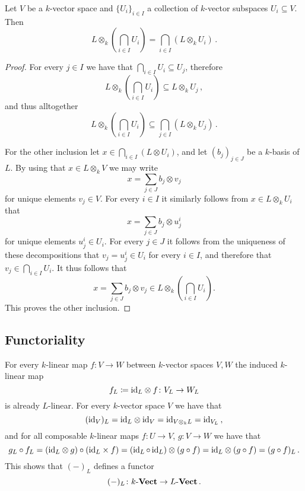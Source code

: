 \begin{corollary}
  Let $V$ be a $k$-vector space and $\{U_i\}_{i \in I}$ a collection of $k$-vector subspaces $U_i \subseteq V$.
  Then
  \[
      L \otimes_k \left( \bigcap_{i \in I} U_i \right)
    = \bigcap_{i \in I} \left( L \otimes_k U_i \right) \,.
  \]
\end{corollary}


\begin{proof}
  For every $j \in I$ we have that $\bigcap_{i \in I} U_i \subseteq U_j$, therefore
  \[
              L \otimes_k \left( \bigcap_{i \in I} U_i \right)
    \subseteq L \otimes_k U_j \,,
  \]
  and thus alltogether
  \[
              L \otimes_k \left( \bigcap_{i \in I} U_i \right)
    \subseteq \bigcap_{j \in I} (L \otimes_k U_j) \,.
  \]
  
  For the other inclusion let $x \in \bigcap_{i \in I} (L \otimes U_i)$, and let $(b_j)_{j \in J}$ be a $k$-basis of $L$.
  By using that $x \in L \otimes_k V$ we may write
  \[
      x
    = \sum_{j \in J} b_j \otimes v_j
  \]
  for unique elements $v_j \in V$.
  For every $i \in I$ it similarly follows from $x \in L \otimes_k U_i$ that
  \[
      x
    = \sum_{j \in J} b_j \otimes u^i_j
  \]
  for unique elements $u^i_j \in U_i$.
  For every $j \in J$ it follows from the uniqueness of these decompositions that $v_j = u^i_j \in U_i$ for every $i \in I$, and therefore that $v_j \in \bigcap_{i \in I} U_i$.
  It thus follows that
  \[
        x
    =   \sum_{j \in J} b_j \otimes v_j
    \in L \otimes_k \left( \bigcap_{i \in I} U_i \right).
  \]
  This proves the other inclusion.
\end{proof}





\subsection{Functoriality}

\begin{fluff}
  For every $k$-linear map $f \colon V \to W$ between $k$-vector spaces $V, W$ the induced $k$-linear map
  \[
              f_L
    \coloneqq {\operatorname{id}_L} \otimes f
    \colon    V_L
    \to       W_L
  \]
  is already $L$-linear.
  For every $k$-vector space $V$ we have that
  \[
      (\operatorname{id}_V)_L
    = {\operatorname{id}_L} \otimes {\operatorname{id}_V}
    = \operatorname{id}_{V \otimes_k L}
    = \operatorname{id}_{V_L} \,,
  \]
  and for all composable $k$-linear maps $f \colon U \to V$, $g \colon V \to W$ we have that
  \[
      g_L \circ f_L
    = ({\operatorname{id}_L} \otimes g) \circ ({\operatorname{id}_L} \times f)
    = (\operatorname{id}_L \circ \operatorname{id}_L) \otimes (g \circ f)
    = {\operatorname{id}_L} \otimes (g \circ f)
    = (g \circ f)_L \,.
  \]
  This shows that $(-)_L$ defines a functor
  \[
            (-)_L
    \colon  k\text{-}\mathbf{Vect}
    \to     L\text{-}\mathbf{Vect} \,.
  \]
\end{fluff}

